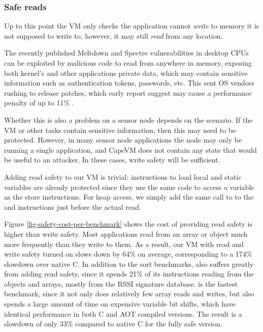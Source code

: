 \subsubsection{Safe reads}
Up to this point the VM only checks the application cannot \emph{write} to memory it is not supposed to write to, however, it may still \emph{read} from any location.

The recently published Meltdown and Spectre vulnerabilities in desktop CPUs can be exploited by malicious code to read from anywhere in memory, exposing both kernel's and other applications private data, which may contain sensitive information such as authentication tokens, passwords, etc. This sent OS vendors rushing to release patches, which early report suggest may cause a performance penalty of up to 11\% \cite{Simakov:2018wp}.

Whether this is also a problem on a sensor node depends on the scenario. If the VM or other tasks contain sensitive information, then this may need to be protected. However, in many sensor node applications the node may only be running a single application, and CapeVM does not contain any state that would be useful to an attacker. In these cases, write safety will be sufficient.

Adding read safety to our VM is trivial: instructions to load local and static variables are already protected since they use the same code to access a variable as the store instructions. For heap access, we simply add the same call to  to the  and  instructions just before the actual read.

Figure \ref{fig-safety-cost-per-benchmark} shows the cost of providing read safety is higher than write safety. Most applications read from an array or object much more frequently than they write to them. As a result, our VM with read and write safety turned on slows down by 64\% on average, corresponding to a 174\% slowdown over native C. In addition to the sort benchmarks,  also suffers greatly from adding read safety, since it spends 21\% of its instructions reading from the objects and arrays, mostly from the RSSI signature database.  is the fastest benchmark, since it not only does relatively few array reads and writes, but also spends a large amount of time on expensive variable bit shifts, which have identical performance in both C and AOT compiled versions. The result is a slowdown of only 33\% compared to native C for the fully safe version.

